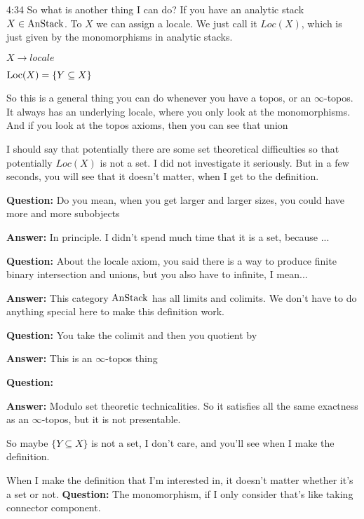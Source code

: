 \begin{unfinished}{4:34}
So what is another thing I can do? If you have an analytic stack $X \in \text{AnStack}$.
To $X$ we can assign a locale. We just call it $Loc(X)$, which is just given by the monomorphisms in analytic stacks.

$ X \rightarrow locale$

$ \text{Loc}(X) = \{ Y \subseteq X \} $

So this is a general thing you can do whenever you have a topos, or an $\infty$-topos.
It always has an underlying locale, where you only look at the monomorphisms. And if you look at the topos axioms, then you can see that union 

I should say that potentially there are some set theoretical difficulties so that potentially $Loc(X)$ is not a set. I did not investigate it seriously. But in a few seconds, you will see that it doesn't matter, when I get to the definition.

\textbf{Question:} Do you mean, when you get larger and larger sizes, you could have more and more subobjects

\textbf{Answer:} In principle. I didn't spend much time that it is a set, because ...

\textbf{Question:} About the locale axiom, you said there is a way to produce finite binary intersection and unions, but you also have to infinite, I mean...

\textbf{Answer:} This category $\text{AnStack}$ has all limits and colimits. We don't have to do anything special here to make this definition work.

\textbf{Question:} You take the colimit and then you quotient by 

\textbf{Answer:} This is an $\infty$-topos thing

\textbf{Question:}

\textbf{Answer:} Modulo set theoretic technicalities. So it satisfies all the same exactness as an $\infty$-topos, but it is not presentable.


So maybe $\{ Y \subseteq X \}$ is not a set, I don't care, and you'll see when I make the definition.

When I make the definition that I'm interested in, it doesn't matter whether it's a set or not. \textbf{Question:} The monomorphism, if I only consider  that's like taking connector component. 


\end{unfinished}
